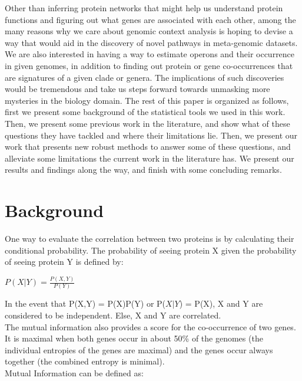 \documentclass{ucetd}
\begin{document}
Other than inferring protein networks that might help us understand protein functions and figuring out what genes are associated with each other, among the many reasons why we care about genomic context analysis is hoping to devise a way that would aid in the discovery of novel pathways in meta-genomic datasets.  We are also interested in having a way to estimate operons and their occurrence in given genomes, in addition to finding out protein or gene co-occurrences that are signatures of a given clade or genera. The implications of such discoveries would be tremendous and take us steps forward towards unmasking more mysteries in the biology domain. 
The rest of this paper is organized as follows, first we present some background of the statistical tools we used in this work. Then, we present some previous work in the literature, and show what of these questions they have tackled and where their limitations lie. Then, we present our work that presents new robust methods to answer some of these questions, and alleviate some limitations the current work in the literature has. We present our results and findings along the way, and finish with some concluding remarks. 


\chapter{Background}
One way to evaluate the correlation between two proteins is by calculating their conditional probability. The probability of seeing  protein X given the probability of seeing protein Y is defined by:

\begin{center}
$P(X|Y) = \frac{P(X,Y)}{P(Y)}$\\
\end{center}
In the event that P(X,Y) = P(X)P(Y) or P($X|Y$) = P(X), X and Y are considered to be independent. Else, X and Y are correlated. \\

The mutual information also provides a score for the co-occurrence of two genes. It is maximal when both genes occur in about 50\% of the genomes (the individual entropies of the genes are maximal) and the genes occur always together (the combined entropy is minimal)\cite{5}.\\
Mutual Information can be defined as: 
\end{document}
